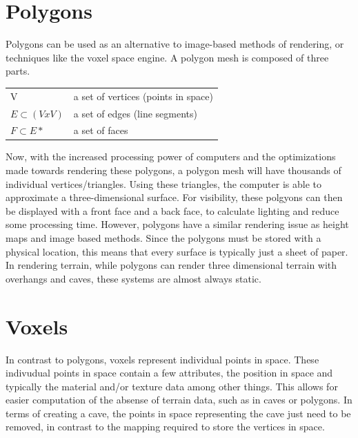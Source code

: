\documentclass[10pt]{report}
\begin{document}
		\section{Polygons}
	
		Polygons can be used as an alternative to image-based methods of rendering, or techniques like the voxel space engine. A polygon mesh is composed of three parts.
		
		\begin{center}
			\begin{tabular}{ l l } 
				V & a set of vertices (points in space)\\ 
				$E {\subset} (V x V)$ & a set of edges (line segments)\\ 
				$F {\subset} E*$  & a set of faces \\
			\end{tabular}
		\end{center}
	
		Now, with the increased processing power of computers and the optimizations made towards rendering these polygons, a polygon mesh will have thousands of individual vertices/triangles. Using these triangles, the computer is able to approximate a three-dimensional surface. For visibility, these polgyons can then be displayed with a front face and a back face, to calculate lighting and reduce some processing time. However, polygons have a similar rendering issue as height maps and image based methods. Since the polygons must be stored with a physical location, this means that every surface is typically just a sheet of paper. In rendering terrain, while polygons can render three dimensional terrain with overhangs and caves, these systems are almost always static. 
		
		\section{Voxels}
	
								In contrast to polygons, voxels represent individual points in space. These indivudual points in space contain a few attributes, the position in space and typically the material and/or texture data among other things. This allows for easier computation of the absense of terrain data, such as in caves or polygons. In terms of creating a cave, the points in space representing the cave just need to be removed, in contrast to the mapping required to store the vertices in space. 
								
\end{document}
